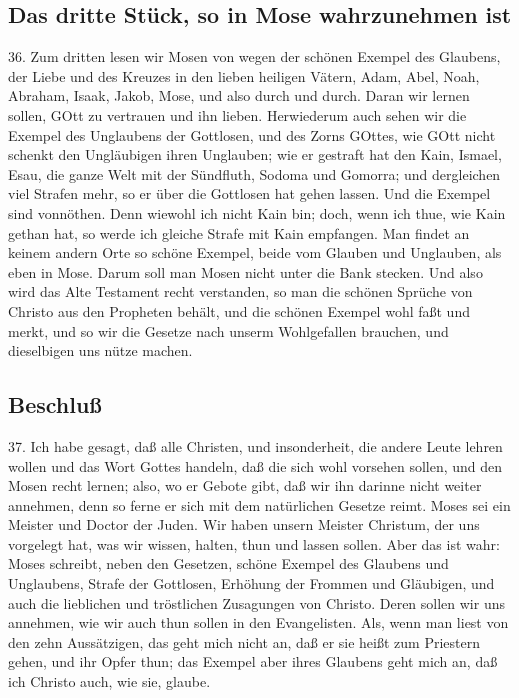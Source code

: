 \subsection{Das dritte Stück, so in Mose wahrzunehmen ist}

36. Zum dritten lesen wir Mosen von wegen der schönen Exempel des Glaubens, der Liebe und des Kreuzes in den lieben heiligen Vätern, Adam, Abel, Noah, Abraham, Isaak, Jakob, Mose, und also durch und durch. Daran wir lernen sollen, GOtt zu vertrauen und ihn lieben. Herwiederum auch sehen wir die Exempel des Unglaubens der Gottlosen, und des Zorns GOttes, wie GOtt nicht schenkt den Ungläubigen ihren Unglauben; wie er gestraft hat den Kain, Ismael, Esau, die ganze Welt mit der Sündfluth, Sodoma und Gomorra; und dergleichen viel Strafen mehr, so er über die Gottlosen hat gehen lassen. Und die Exempel sind vonnöthen. Denn wiewohl ich nicht Kain bin; doch, wenn ich thue, wie Kain gethan hat, so werde ich gleiche Strafe mit Kain empfangen. Man findet an keinem andern Orte so schöne Exempel, beide vom Glauben und Unglauben, als eben in Mose. Darum soll man Mosen nicht unter die Bank stecken. Und also wird das Alte Testament recht verstanden, so man die schönen Sprüche von Christo aus den Propheten behält, und die schönen Exempel wohl faßt und merkt, und so wir die Gesetze nach unserm Wohlgefallen brauchen, und dieselbigen uns nütze machen.

\subsection{Beschluß}

37. Ich habe gesagt, daß alle Christen, und insonderheit, die andere Leute lehren wollen und das Wort Gottes handeln, daß die sich wohl vorsehen sollen, und den Mosen recht lernen; also, wo er Gebote gibt, daß wir ihn darinne nicht weiter annehmen, denn so ferne er sich mit dem natürlichen Gesetze reimt. Moses sei ein Meister und Doctor der Juden. Wir haben unsern Meister Christum, der uns vorgelegt hat, was wir wissen, halten, thun und lassen sollen. Aber das ist wahr: Moses schreibt, neben den Gesetzen, schöne Exempel des Glaubens und Unglaubens, Strafe der Gottlosen, Erhöhung der Frommen und Gläubigen, und auch die lieblichen und tröstlichen Zusagungen von Christo. Deren sollen wir uns annehmen, wie wir auch thun sollen in den Evangelisten. Als, wenn man liest von den zehn Aussätzigen, das geht mich nicht an, daß er sie heißt zum Priestern gehen, und ihr Opfer thun; das Exempel aber ihres Glaubens geht mich an, daß ich Christo auch, wie sie, glaube.

